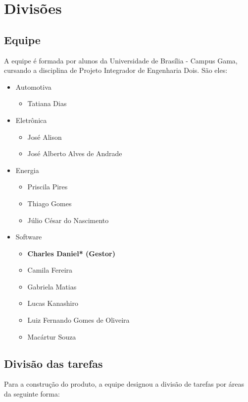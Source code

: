 \chapter[Divisões]{Divisões}

\section{Equipe}
A equipe é formada por alunos da Universidade de Brasília - Campus Gama, cursando a disciplina de Projeto Integrador de Engenharia Dois. São eles:
\begin{itemize}
	\item Automotiva
		\begin{itemize}
			\item Tatiana Dias
		\end{itemize}
	\item Eletrônica
		\begin{itemize}
			\item José Alison
			\item José Alberto Alves de Andrade
		\end{itemize}
	\item Energia
		\begin{itemize}
			\item Priscila Pires
			\item Thiago Gomes
			\item Júlio César do Nascimento
		\end{itemize}
	\item Software
		\begin{itemize}
			\item \textbf{Charles Daniel* (Gestor)}
			\item Camila Fereira
			\item Gabriela Matias
			\item Lucas Kanashiro
			\item Luiz Fernando Gomes de Oliveira
			\item Macártur Souza
		\end{itemize}
\end{itemize}

\section{Divisão das tarefas}
Para a construção do produto, a equipe designou a divisão de tarefas por áreas da seguinte forma:

